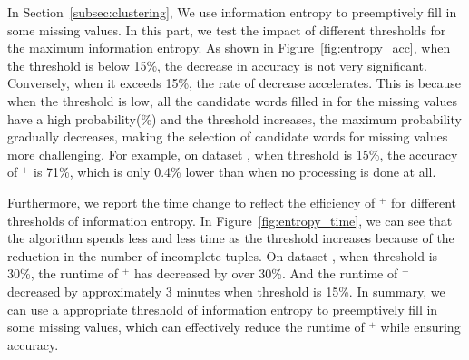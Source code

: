%
In Section~\ref{subsec:clustering}, We use information entropy to preemptively fill in some missing values. In this part, we test the impact of different thresholds for the maximum information entropy. As shown in Figure~\ref{fig:entropy_acc}, when the threshold is below 15\%, the decrease in accuracy is not very significant. Conversely, when it exceeds 15\%, the rate of decrease accelerates. This is because when the threshold is low, all the candidate words filled in for the missing values have a high probability(\%) and the threshold increases, the maximum probability gradually decreases, making the selection of candidate words for missing values more challenging. For example, on dataset \imdbl, when threshold is 15\%, the accuracy of \ours$^+$ is 71\%, which is only 0.4\% lower than when no processing is done at all.

Furthermore, we report the time change to reflect the efficiency of \ours$^+$ for different thresholds of information entropy. In Figure~\ref{fig:entropy_time}, we can see that the algorithm spends less and less time as the threshold increases because of the reduction in the number of incomplete tuples. On dataset \imdbl, when threshold is 30\%, the runtime of \ours$^+$ has decreased by over 30\%. And the runtime of \ours$^+$ decreased by approximately 3 minutes when threshold is 15\%.
%
In summary, we can use a appropriate threshold of information entropy to preemptively fill in some missing values, which can effectively reduce the runtime of \ours$^+$ while ensuring accuracy. 
